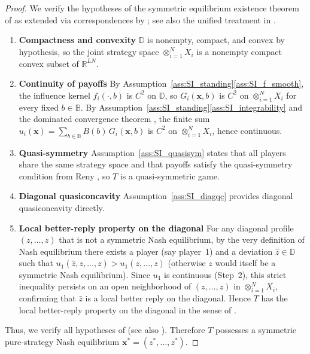 \documentclass{article}
\begin{document}
    \begin{proof}
        We verify the hypotheses of the symmetric equilibrium existence theorem
        of \cite[Theorem~4]{baye1993} as extended via correspondences by
        \cite[Theorems~5]{bichlaraki2012}; see also the unified
        treatment in \cite[Theorem~5]{reny2020nash}.

    
        \begin{enumerate}[label=(\roman*)]
        \item \textbf{Compactness and convexity}
        $\mathbb{D}$ is nonempty, compact, and convex by hypothesis, so the
        joint strategy space $\otimes_{i=1}^N X_i$ is a nonempty compact convex subset
        of $\mathbb{R}^{LN}$.


        \item \textbf{Continuity of payoffs}
        By Assumption~\ref{ass:SI_standing}\ref{ass:SI_f_smooth}, the influence
        kernel $f_i(\cdot, b)$ is $C^2$ on $\mathbb{D}$, so $G_i(\mathbf{x}, b)$
        is $C^2$ on $\otimes_{i=1}^N X_i$ for every fixed $b \in \mathbb{B}$.  By
        Assumption~\ref{ass:SI_standing}\ref{ass:SI_integrability} and the
        dominated convergence theorem \cite[Theorem~1.34]{rudin1987real}, the
        finite sum $u_i(\mathbf{x}) = \sum_{b \in \mathbb{B}} B(b)\,G_i(\mathbf{x}, b)$
        is $C^2$ on $\otimes_{i=1}^N X_i$, hence continuous.


        \item \textbf{Quasi-symmetry}
        Assumption~\ref{ass:SI_quasisym} states that all players share the same
        strategy space and that payoffs satisfy the quasi-symmetry condition from Reny
        \cite{reny2020nash}, so $T$ is a quasi-symmetric game.

        
        \item \textbf{Diagonal quasiconcavity}
        Assumption~\ref{ass:SI_diagqc} provides diagonal quasiconcavity directly.

        
        \item \textbf{Local better-reply property on the diagonal}
        For any diagonal profile $(z, \ldots, z)$ that is not a symmetric Nash
        equilibrium, by the very definition of Nash equilibrium there exists a player
        (say player~1) and a deviation $\hat{z} \in \mathbb{D}$ such that
        $u_1(\hat{z}, z, \ldots, z) > u_1(z, \ldots, z)$ (otherwise $z$ would itself
        be a symmetric Nash equilibrium).  Since $u_1$ is continuous (Step~2), this
        strict inequality persists on an open neighborhood of $(z,\ldots,z)$ in
        $\otimes_{i=1}^N X_i$, confirming that $\hat{z}$ is a local better reply on the
        diagonal.  Hence $T$ has the local better-reply property on the diagonal
        in the sense of \cite{baye1993}.
        \end{enumerate}
        Thus, we verify all hypotheses of \cite[Theorem~4]{baye1993}
        (see also \cite[Theorem~5]{reny2020nash}).  Therefore $T$ possesses
        a symmetric pure-strategy Nash equilibrium
        $\mathbf{x}^{*} = (z^{*}, \ldots, z^{*})$.
    \end{proof}
\end{document}
